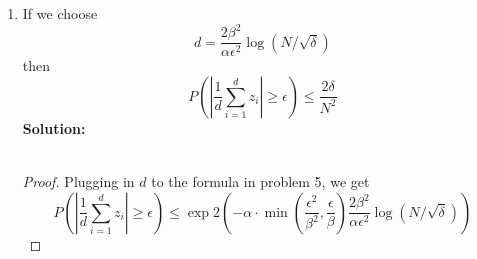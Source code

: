 \documentclass[11pt]{article}
\begin{document}
\begin{enumerate}
	\begin{equation*}
		P \left( \left| \frac{1}{d} \sum_{i=1}^d z_i \right| \ge \epsilon \right) \le \exp 2 \left(- \alpha \cdot \min \left( \frac{\epsilon^2}{\beta^2},\frac{\epsilon}{\beta} \right)d \right)
	\end{equation*}
	\textbf{Solution:} \\\\
	\begin{proof}
	Since the above equation is the corollary we are supposed to use, we can simply justify our assumptions and then it follows that the above formula works. For that, we need to make sure $z_i$ is an independent, mean-zero, sub-exponential RV.
	To show mean-zero
	\begin{align*}
		E[z_i] &= E \left[ y_i^2 - E[y_i^2]\right] \\
		&= E \left[ y_i^2 \right] - E[y_i^2] \\
		&= 0
	\end{align*}
	Therefore it is mean zero. Now, by the problem statement on the homework, it says we can show $z_i$ is sub-exponential with the inequality. Therefore, by definition we showed it is subexponential.
	\par Lastly, we show it is independent. For this, we know $y_i$ is independent and that any function on an independent random varible remains independent. Thus, $y_i^2$ is independent. Now note that $E[y_i^2]$ is a constant and so redefining our random variable to account for the constant does not affect independent. 
	Thus, $z_i$ is independent. 
	\par Because we showed that $z_i$ is an independent, mean-zero, subexponential random variable, we can conclude that the general Bernstein inequality will hold.
	\end{proof}
	\item If we choose
	\begin{equation*}
		d = \frac{2\beta^2}{\alpha\epsilon^2}\log\left(N/\sqrt{\delta}\right)
	\end{equation*}
	then
	\begin{equation*}
		P \left( \left| \frac{1}{d} \sum_{i=1}^d z_i \right| \ge \epsilon \right) \le \frac{2\delta}{N^2}
	\end{equation*}
	\textbf{Solution:} \\\\
	\begin{proof}
	Plugging in $d$ to the formula in problem 5, we get
	\begin{equation*}
		P \left( \left| \frac{1}{d} \sum_{i=1}^d z_i \right| \ge \epsilon \right) \le \exp 2 \left(- \alpha \cdot \min \left( \frac{\epsilon^2}{\beta^2},\frac{\epsilon}{\beta} \right) \frac{2\beta^2}{\alpha\epsilon^2}\log\left(N/\sqrt{\delta}\right) \right)

\end{equation*}
\end{proof}
\end{enumerate}
\end{document}
